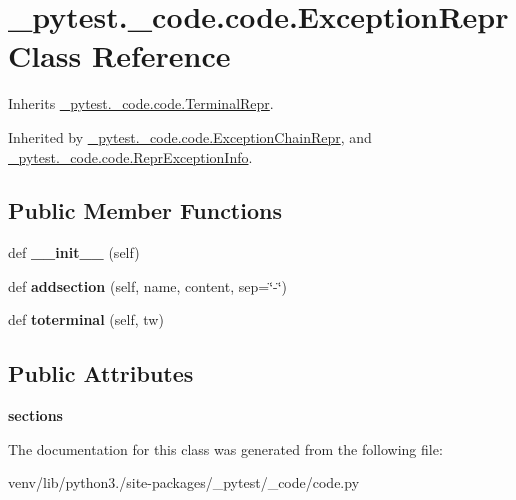 \hypertarget{class__pytest_1_1__code_1_1code_1_1_exception_repr}{}\section{\+\_\+pytest.\+\_\+code.\+code.\+Exception\+Repr Class Reference}
\label{class__pytest_1_1__code_1_1code_1_1_exception_repr}


Inherits \hyperlink{class__pytest_1_1__code_1_1code_1_1_terminal_repr}{\+\_\+pytest.\+\_\+code.\+code.\+Terminal\+Repr}.



Inherited by \hyperlink{class__pytest_1_1__code_1_1code_1_1_exception_chain_repr}{\+\_\+pytest.\+\_\+code.\+code.\+Exception\+Chain\+Repr}, and \hyperlink{class__pytest_1_1__code_1_1code_1_1_repr_exception_info}{\+\_\+pytest.\+\_\+code.\+code.\+Repr\+Exception\+Info}.

\subsection*{Public Member Functions}
\begin{DoxyCompactItemize}
\item 
\mbox{\label{class__pytest_1_1__code_1_1code_1_1_exception_repr_ad4320213e2be3b26aecf0073c296a2a1}} 
def {\bfseries \+\_\+\+\_\+init\+\_\+\+\_\+} (self)
\item 
\mbox{\label{class__pytest_1_1__code_1_1code_1_1_exception_repr_ad88838e63027c4f1f3f730a95779d5b3}} 
def {\bfseries addsection} (self, name, content, sep=\char`\"{}-\/\char`\"{})
\item 
\mbox{\label{class__pytest_1_1__code_1_1code_1_1_exception_repr_a69e952089315cd8586cc6fe1824b5a73}} 
def {\bfseries toterminal} (self, tw)
\end{DoxyCompactItemize}
\subsection*{Public Attributes}
\begin{DoxyCompactItemize}
\item 
\mbox{\label{class__pytest_1_1__code_1_1code_1_1_exception_repr_a35e1eaa2776b2a01663d52fcbeed74c0}} 
{\bfseries sections}
\end{DoxyCompactItemize}


The documentation for this class was generated from the following file\+:\begin{DoxyCompactItemize}
\item 
venv/lib/python3./site-\/packages/\+\_\+pytest/\+\_\+code/code.\+py\end{DoxyCompactItemize}
